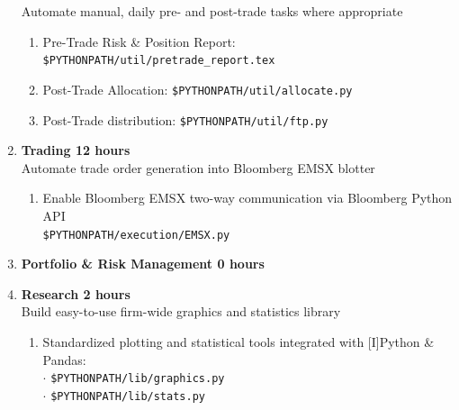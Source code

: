 \documentclass[6pt]{article}
\begin{document}
\begin{enumerate}
    Automate manual, daily pre- and post-trade tasks where appropriate \\
    \begin{enumerate}
      \item Pre-Trade Risk \& Position Report: \texttt{\$PYTHONPATH/util/pretrade\_report.tex} \\
      \item Post-Trade Allocation: \texttt{\$PYTHONPATH/util/allocate.py} \\
      \item Post-Trade distribution: \texttt{\$PYTHONPATH/util/ftp.py} \\
    \end{enumerate}
  \item \textbf{Trading \hfill 12 hours} \\
    Automate trade order generation into Bloomberg EMSX blotter \\
    \begin{enumerate}
      \item Enable Bloomberg EMSX two-way communication via Bloomberg Python API \\
        \texttt{\$PYTHONPATH/execution/EMSX.py} \\
    \end{enumerate}
  \item \textbf{Portfolio \& Risk Management \hfill 0 hours} \\
  \item \textbf{Research \hfill 2 hours} \\
    Build easy-to-use firm-wide graphics and statistics library \\
    \begin{enumerate}
      \item Standardized plotting and statistical tools integrated with [I]Python \& Pandas: \\
        $\cdot$ \texttt{\$PYTHONPATH/lib/graphics.py} \\
        $\cdot$ \texttt{\$PYTHONPATH/lib/stats.py} \\
    \end{enumerate}
\end{enumerate}

\newpage
\end{document}

